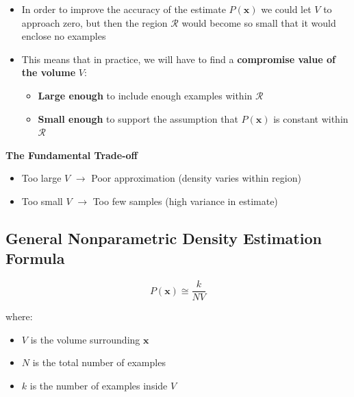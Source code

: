 \documentclass[11pt,a4paper]{article}
\theoremstyle{definition}
\theoremstyle{plain}
\theoremstyle{remark}
\begin{document}
\begin{itemize}
    \item In order to improve the accuracy of the estimate $P(\mathbf{x})$ we could let $V$ to approach zero, but then the region $\mathcal{R}$ would become so small that it would enclose no examples
    
    \item This means that in practice, we will have to find a \textbf{compromise value of the volume} $V$:
    \begin{itemize}
        \item \textbf{Large enough} to include enough examples within $\mathcal{R}$
        \item \textbf{Small enough} to support the assumption that $P(\mathbf{x})$ is constant within $\mathcal{R}$
    \end{itemize}
\end{itemize}

\begin{center}
\colorbox{red!15}{\parbox{0.9\textwidth}{
\textbf{The Fundamental Trade-off}\\[0.2cm]
\begin{itemize}
    \item Too large $V$ $\rightarrow$ Poor approximation (density varies within region)
    \item Too small $V$ $\rightarrow$ Too few samples (high variance in estimate)
\end{itemize}
}}
\end{center}

\subsection{General Nonparametric Density Estimation Formula}

\begin{tcolorbox}[colback=orange!5!white,colframe=orange!75!black,title=\textbf{General Expression for Nonparametric Density Estimation}]
\[
P(\mathbf{x}) \cong \frac{k}{NV}
\]

where:
\begin{itemize}
    \item $V$ is the volume surrounding $\mathbf{x}$
    \item $N$ is the total number of examples
    \item $k$ is the number of examples inside $V$
\end{itemize}
\end{tcolorbox}
\end{document}
